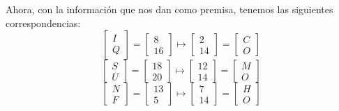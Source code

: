\documentclass[letterpaper,11pt]{article}
\begin{document}
\begin{enumerate}
\begin{enumerate}
        Ahora, con la información que nos dan como premisa, tenemos las 
        siguientes correspondencias:
        \begin{equation*}
            \begin{bmatrix} I  \\ Q \end{bmatrix} =
            \begin{bmatrix} 8 \\ 16 \end{bmatrix} \mapsto
            \begin{bmatrix} 2 \\ 14 \end{bmatrix} =
            \begin{bmatrix} C \\ O \end{bmatrix}
        \end{equation*}
        \begin{equation*}
            \begin{bmatrix} S  \\ U \end{bmatrix} =
            \begin{bmatrix} 18 \\ 20 \end{bmatrix} \mapsto
            \begin{bmatrix} 12 \\ 14 \end{bmatrix} =
            \begin{bmatrix} M \\ O \end{bmatrix}
        \end{equation*}
        \begin{equation*}
            \begin{bmatrix} N \\ F \end{bmatrix} =
            \begin{bmatrix} 13 \\ 5 \end{bmatrix} \mapsto
            \begin{bmatrix} 7 \\ 14 \end{bmatrix} =
            \begin{bmatrix} H \\ O \end{bmatrix}
        \end{equation*}
        \begin{equation*}

\end{equation*}
\end{enumerate}
\end{enumerate}
\end{document}
